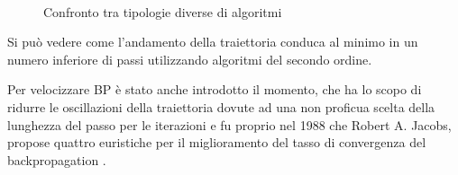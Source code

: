 \begin{figure}[hbtb]
\centering
{} \quad
{} \\
\caption{Confronto tra tipologie diverse di algoritmi}
\label{discese}
\end{figure}
\vspace{5 mm}

Si può vedere come l'andamento della traiettoria conduca al minimo in un numero inferiore di passi utilizzando algoritmi del secondo ordine.

Per velocizzare BP è stato anche introdotto il momento, che ha lo scopo di ridurre le oscillazioni della traiettoria dovute ad una non proficua scelta della lunghezza del passo per le iterazioni e fu proprio nel 1988 che Robert A. Jacobs, propose quattro euristiche per il miglioramento del tasso di convergenza del backpropagation \cite{nielsen_book}.

